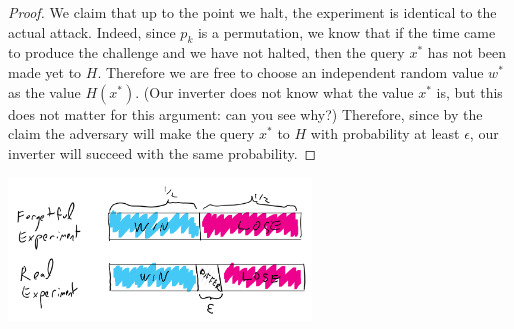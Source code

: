 \begin{proof}
We claim that up to the point we halt, the experiment is identical to
the actual attack. Indeed, since \(p_k\) is a permutation, we know that
if the time came to produce the challenge and we have not halted, then
the query \(x^*\) has not been made yet to \(H\). Therefore we are free
to choose an independent random value \(w^*\) as the value \(H(x^*)\).
(Our inverter does not know what the value \(x^*\) is, but this does not
matter for this argument: can you see why?) Therefore, since by the
claim the adversary will make the query \(x^*\) to \(H\) with
probability at least \(\epsilon\), our inverter will succeed with the
same probability.

\end{proof}


\begin{marginfigure}
\centering
\includegraphics[width=\linewidth, height=1.5in, keepaspectratio]{../figure/gnomeTDPENC.png}
\caption{In the proof of security of TDPENC, we show that if the
assumption of the claim is violated, the ``forgetful experiment'' is
identical to the real experiment with probability larger \(1-\epsilon\).
In such a case, even if all that probability mass was on the points in
the sample space where the adversary in the forgetful experiment will
lose and the adversary of the real experiment will win, the probability
of winning in the latter experiment would still be less than
\(1/2+\epsilon\).}
\label{TDPENCgnomefig}
\end{marginfigure}


\hypertarget{noromtdpthm}{}

